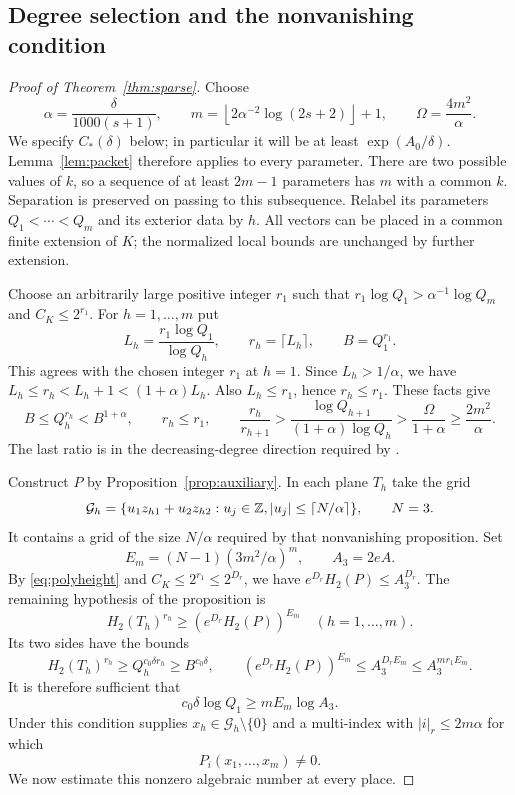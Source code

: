 \documentclass[11pt]{article}
\numberwithin{equation}{section}
\theoremstyle{remark}\newtheorem{remark}[theorem]{Remark}
\begin{document}
\subsection{Degree selection and the nonvanishing condition}
\begin{proof}[Proof of Theorem~\ref{thm:sparse}]
Choose
\begin{equation}\label{eq:parameters}
 \alpha=\frac{\delta}{1000(s+1)},\qquad
 m=\left\lfloor2\alpha^{-2}\log(2s+2)\right\rfloor+1,
 \qquad \Omega=\frac{4m^2}{\alpha}.
\end{equation}
We specify $C_*(\delta)$ below; in particular it will be at least
$\exp(A_0/\delta)$. Lemma~\ref{lem:packet} therefore applies to
every parameter. There are two possible values of $k$, so a sequence
of at least $2m-1$ parameters has $m$ with a common $k$.
Separation is preserved on passing to this subsequence. Relabel its
parameters $Q_1<\cdots<Q_m$ and its exterior data by $h$.
All vectors can be placed in a common finite extension of $K$;
the normalized local bounds are unchanged by further extension.

Choose an arbitrarily large positive integer $r_1$ such that
$r_1\log Q_1>\alpha^{-1}\log Q_m$ and $C_K\le2^{r_1}$.
For $h=1,\ldots,m$ put
\[
 L_h=\frac{r_1\log Q_1}{\log Q_h},\qquad
 r_h=\lceil L_h\rceil,\qquad B=Q_1^{r_1}.
\]
This agrees with the chosen integer $r_1$ at $h=1$.
Since $L_h>1/\alpha$, we have
$L_h\le r_h<L_h+1<(1+\alpha)L_h$. Also $L_h\le r_1$, hence
$r_h\le r_1$. These facts give
\begin{equation}\label{eq:degrees}
 B\le Q_h^{r_h}<B^{1+\alpha},\qquad r_h\le r_1,\qquad
 \frac{r_h}{r_{h+1}}>
 \frac{\log Q_{h+1}}{(1+\alpha)\log Q_h}
 >\frac{\Omega}{1+\alpha}\ge\frac{2m^2}{\alpha}.
\end{equation}
The last ratio is in the decreasing-degree direction required by
\cite[Proposition~12.1, equation~(12.3)]{EF13}.

Construct $P$ by Proposition~\ref{prop:auxiliary}. In each plane $T_h$
take the grid
\[
 \mathcal G_h=\{u_1z_{h1}+u_2z_{h2}:u_j\in\mathbb Z,
                    |u_j|\le\lceil N/\alpha\rceil\},\qquad N=3.
\]
It contains a grid of the size $N/\alpha$ required by that
nonvanishing proposition. Set
\[
 E_m=(N-1)(3m^2/\alpha)^m,\qquad A_3=2eA.
\]
By \eqref{eq:polyheight} and $C_K\le2^{r_1}\le2^{D_r}$,
we have $e^{D_r}H_2(P)\le A_3^{D_r}$.
The remaining hypothesis of the proposition is
\begin{equation}\label{eq:nonvanishheight}
 H_2(T_h)^{r_h}\ge(e^{D_r}H_2(P))^{E_m}
 \quad(h=1,\ldots,m).
\end{equation}
Its two sides have the bounds
\[
 H_2(T_h)^{r_h}\ge Q_h^{c_0\delta r_h}\ge B^{c_0\delta},
 \qquad
 (e^{D_r}H_2(P))^{E_m}\le A_3^{D_rE_m}\le A_3^{mr_1E_m}.
\]
It is therefore sufficient that
\begin{equation}\label{eq:cutoffone}
 c_0\delta\log Q_1\ge mE_m\log A_3.
\end{equation}
Under this condition \cite[Proposition~12.1]{EF13} supplies
$x_h\in\mathcal G_h\setminus\{0\}$ and a multi-index with
$|i|_r\le2m\alpha$ for which
\[
 P_i(x_1,\ldots,x_m)\ne0.
\]
We now estimate this nonzero algebraic number at every place.


\end{proof}
\end{document}
